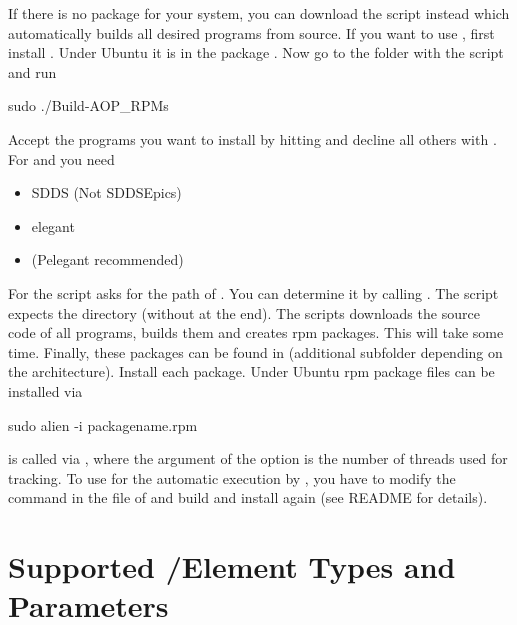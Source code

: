 \documentclass[a4paper]{scrartcl}
\begin{document}
If there is no \ele package for your system, you can download the 
script instead which automatically builds all desired programs from source.
%
If you want to use , first install . Under Ubuntu it is
in the package .
%
Now go to the folder with the  script and run
\begin{bashcode}
  sudo ./Build-AOP_RPMs
\end{bashcode}
Accept the programs you want to install by hitting  and decline all others
with . For \pal and \polem you need
\begin{itemize}
\item SDDS (Not SDDSEpics)
\item elegant
\item (Pelegant recommended)
\end{itemize}
For  the script asks for the path of . You can
determine it by calling . The script expects the directory (without
 at the end).
%
The scripts downloads the source code of all programs, builds them and creates rpm
packages. This will take some time. Finally, these packages can be found in
 (additional subfolder depending on the architecture).
Install each package. Under Ubuntu rpm package files can be installed via
\begin{bashcode}
  sudo alien -i packagename.rpm
\end{bashcode}

 is called via , where the argument of
the option  is the number of threads used for tracking.
%
To use  for the automatic \ele execution by \polem, you have to modify
the \ele command in the  file of \pal and build and install \pal
again (see \pal README for details).


\clearpage
\section{Supported \ele/\madx Element Types and Parameters}
\label{sec:types}
\end{document}
